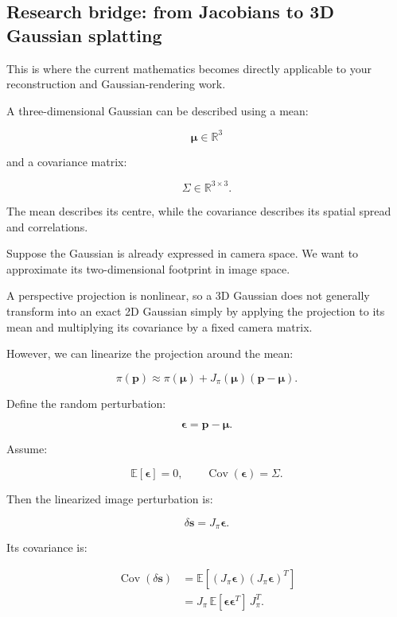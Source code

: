 \subsection{Research bridge: from Jacobians to 3D Gaussian splatting}\label{02-foundations-ii-ch021-research-bridge-from-jacobians-to-3d-gaussian-splatting}

This is where the current mathematics becomes directly applicable to your reconstruction and Gaussian-rendering work.

A three-dimensional Gaussian can be described using a mean:

\[
\boldsymbol\mu\in\mathbb R^3
\]

and a covariance matrix:

\[
\Sigma\in\mathbb R^{3\times3}.
\]

The mean describes its centre, while the covariance describes its spatial spread and correlations.

Suppose the Gaussian is already expressed in camera space. We want to approximate its two-dimensional footprint in image space.

A perspective projection is nonlinear, so a 3D Gaussian does not generally transform into an exact 2D Gaussian simply by applying the projection to its mean and multiplying its covariance by a fixed camera matrix.

However, we can linearize the projection around the mean:

\[
\pi(\mathbf p) \approx \pi(\boldsymbol\mu) + J_\pi(\boldsymbol\mu) (\mathbf p-\boldsymbol\mu).
\]

Define the random perturbation:

\[
\boldsymbol\epsilon=\mathbf p-\boldsymbol\mu.
\]

Assume:

\[
\mathbb E[\boldsymbol\epsilon]=0, \qquad \operatorname{Cov}(\boldsymbol\epsilon)=\Sigma.
\]

Then the linearized image perturbation is:

\[
\delta\mathbf s=J_\pi\boldsymbol\epsilon.
\]

Its covariance is:

\[
\begin{aligned} \operatorname{Cov}(\delta\mathbf s) &=\mathbb E[ (J_\pi\boldsymbol\epsilon) (J_\pi\boldsymbol\epsilon)^T ]\\ &=J_\pi\, \mathbb E[\boldsymbol\epsilon\boldsymbol\epsilon^T]\, J_\pi^T. \end{aligned}
\]

